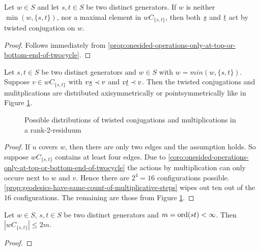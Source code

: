 \begin{coro}
	Let $w \in S$ and let $s,t \in S$ be two distinct generators. If $w$ is neither $\min(w,\{s,t\})$, nor a maximal element in $wC_{\{s,t\}}$, then both $\underline{s}$ and $\underline{t}$ act by twisted conjugation on $w$.

	\begin{proof}
		Follows immediately from \ref{prop:onesided-operations-only-at-top-or-bottom-end-of-twocycle}.
	\end{proof}
\end{coro}

\begin{lemm}
	Let $s,t \in S$ be two distinct generators and $w \in S$ with $w = min(w,\{s,t\})$. Suppose $v \in wC_{\{s,t\}}$ with $v \underline{s} \prec v$ and $v \underline{t} \prec v$. Then the twisted conjugations and mulitplications are distributed axisymmetrically or pointsymmetrically like in Figure \ref{fig:dist-one-bothsided-actions-in-rank-2-residuum}.

	\begin{figure}[ht]
		\centering
		
		
		
		
		
		
		\caption{Possible distributions of twisted conjugations and multiplications in a rank-2-residuum}
		\label{fig:dist-one-bothsided-actions-in-rank-2-residuum}
	\end{figure}

	\begin{proof}
		If $u$ covers $w$, then there are only two edges and the assumption holds. So suppose $wC_{\{s,t\}}$ contains at least four edges. Due to \ref{coro:onesided-operations-only-at-top-or-bottom-end-of-twocycle} the actions by multiplication can only occure next to $w$ and $v$. Hence there are $2^4 = 16$ configurations possible. \ref{prop:geodesics-have-same-count-of-multiplicative-steps} wipes out ten out of the 16 configurations. The remaining are those from Figure \ref{fig:dist-one-bothsided-actions-in-rank-2-residuum}.
	\end{proof}
\end{lemm}

\begin{lemm}
	Let $w \in S$, $s,t \in S$ be two distinct generators and $m = \operatorname{ord}(st) < \infty$. Then $|wC_{\{s,t\}}| \leq 2m$.

	\begin{proof}
		\todo
	\end{proof}
\end{lemm}

